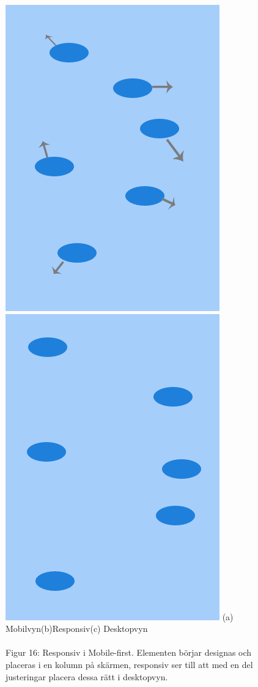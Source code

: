 \documentclass[11pt]{article}
\begin{document}
\begin{figure}[H]
{\includegraphics[scale=0.27]{pics/responsiv.png}\hspace{2em}%
\includegraphics[scale=0.27]{pics/desktop.png}%
}
\hspace{2cm}(a) Mobilvyn\hspace{2.3cm}(b)Responsiv\hspace{2.1cm}(c) Desktopvyn
\\\\
\hspace{0.15cm}Figur 16: Responsiv i Mobile-first. Elementen börjar designas och placeras i en kolumn på skärmen, responsiv ser till att med en del justeringar placera dessa rätt i desktopvyn.
\end{figure}
\end{document}

